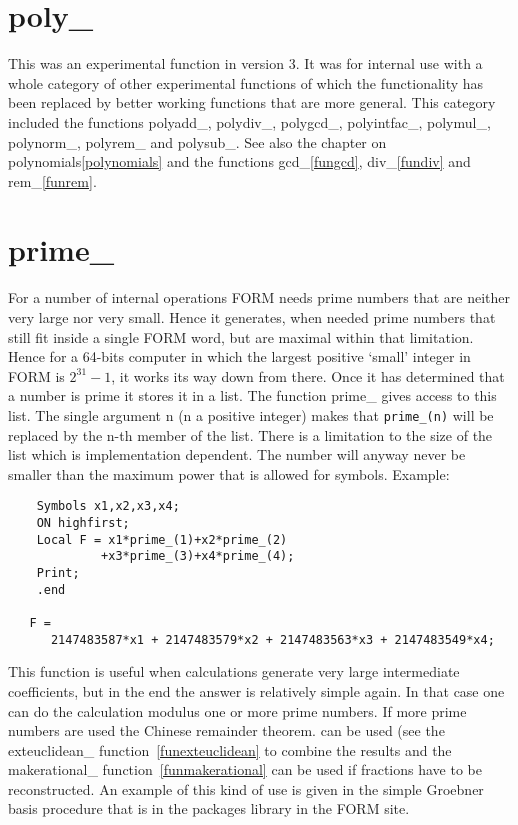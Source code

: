 \section{poly\_}
\label{funpoly}
\noindent This was an experimental function in version 3. It was for 
internal use with a whole category of other experimental functions of which 
the functionality has been replaced by better working functions that are 
more general. This category included the functions 
polyadd\_,
polydiv\_,
polygcd\_,
polyintfac\_,
polymul\_,
polynorm\_,
polyrem\_ and
polysub\_.
See also the chapter on polynomials\ref{polynomials} and the functions 
gcd\_\ref{fungcd}, div\_\ref{fundiv} and rem\_\ref{funrem}.


\section{prime\_}
\label{funprime}

\noindent For a number of internal operations FORM needs prime numbers that 
are neither very large nor very small. Hence it generates, when needed 
prime numbers that still fit inside a single FORM word, but are maximal 
within that limitation. Hence for a 64-bits computer in which the largest 
positive `small' integer in FORM is $2^{31}-1$, it works its way down from 
there. Once it has determined that a number is prime it stores it in a 
list. The function prime\_ gives access to this list. The single argument 
n (n a positive integer) makes that \verb:prime_(n): will be replaced by 
the n-th member of the list. There is a limitation to the size of the list 
which is implementation dependent. The number will anyway never be smaller 
than the maximum power that is allowed for symbols. Example:
\begin{verbatim}
    Symbols x1,x2,x3,x4;
    ON highfirst;
    Local F = x1*prime_(1)+x2*prime_(2)
             +x3*prime_(3)+x4*prime_(4);
    Print;
    .end

   F =
      2147483587*x1 + 2147483579*x2 + 2147483563*x3 + 2147483549*x4;
\end{verbatim}
This function is useful when calculations generate very large intermediate 
coefficients, but in the end the answer is relatively simple again. In that 
case one can do the calculation modulus one or more prime numbers. If more 
prime numbers are used the Chinese remainder theorem. can be used (see the exteuclidean\_ 
function~\ref{funexteuclidean} to combine the results and the 
makerational\_ function~\ref{funmakerational} can be used if fractions have 
to be reconstructed. An example of this kind of use is given in the simple 
Groebner basis procedure that is in the packages library in the FORM site.

